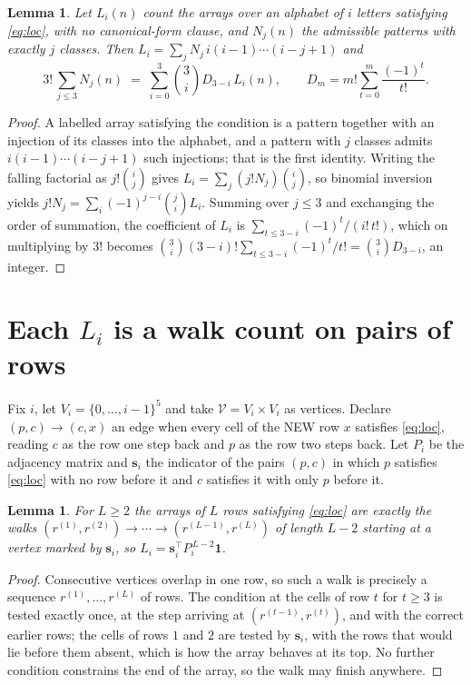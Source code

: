 \documentclass[11pt,a4paper]{article}
\theoremstyle{plain}
\newtheorem{lemma}[theorem]{Lemma}
\theoremstyle{definition}
\begin{document}
\begin{lemma}\label{lem:inv}
Let $L_i(n)$ count the arrays over an alphabet of $i$ letters satisfying \eqref{eq:loc},
with no canonical-form clause, and $N_j(n)$ the admissible patterns with exactly $j$ classes.
Then $L_i=\sum_j N_j\,i(i-1)\cdots(i-j+1)$ and
\[
3!\,\sum_{j\le 3}N_j(n)\;=\;\sum_{i=0}^{3}\binom{3}{i}D_{3-i}\,L_i(n),
\qquad D_m=m!\sum_{t=0}^{m}\frac{(-1)^t}{t!} .
\]
\end{lemma}

\begin{proof}
A labelled array satisfying the condition is a pattern together with an injection of its
classes into the alphabet, and a pattern with $j$ classes admits $i(i-1)\cdots(i-j+1)$ such
injections; that is the first identity. Writing the falling factorial as $j!\binom{i}{j}$
gives $L_i=\sum_j(j!N_j)\binom{i}{j}$, so binomial inversion yields
$j!N_j=\sum_i(-1)^{j-i}\binom{j}{i}L_i$. Summing over $j\le3$ and exchanging the
order of summation, the coefficient of $L_i$ is $\sum_{t\le3-i}(-1)^t/(i!\,t!)$, which on
multiplying by $3!$ becomes
$\binom{3}{i}(3-i)!\sum_{t\le3-i}(-1)^t/t!=\binom{3}{i}D_{3-i}$, an
integer.
\end{proof}

\section{Each $L_i$ is a walk count on pairs of rows}

Fix $i$, let $V_i=\{0,\dots,i-1\}^{5}$ and take $\mathcal V=V_i\times V_i$ as vertices.
Declare $(p,c)\to(c,x)$ an edge when every cell of the NEW row $x$ satisfies
\eqref{eq:loc}, reading $c$ as the row one step back and $p$ as the row two steps
back. Let $P_i$ be the adjacency matrix and $\mathbf{s}_i$ the indicator of the pairs
$(p,c)$ in which $p$ satisfies \eqref{eq:loc} with no row before it and $c$ satisfies it
with only $p$ before it.

\begin{lemma}\label{lem:walk}
For $L\ge2$ the arrays of $L$ rows satisfying \eqref{eq:loc} are exactly the walks
$(r^{(1)},r^{(2)})\to\cdots\to(r^{(L-1)},r^{(L)})$ of length $L-2$ starting at a
vertex marked by $\mathbf{s}_i$, so
$L_i=\mathbf{s}_i^{\!\top}P_i^{\,L-2}\mathbf{1}$.
\end{lemma}

\begin{proof}
Consecutive vertices overlap in one row, so such a walk is precisely a sequence
$r^{(1)},\dots,r^{(L)}$ of rows. The condition at the cells of row $t$ for $t\ge3$
is tested exactly once, at the step arriving at $(r^{(t-1)},r^{(t)})$, and with the
correct earlier rows; the cells of rows $1$ and $2$ are tested by $\mathbf{s}_i$, with
the rows that would lie before them absent, which is how the array behaves at its top. No
further condition constrains the end of the array, so the walk may finish anywhere.
\end{proof}
\end{document}
